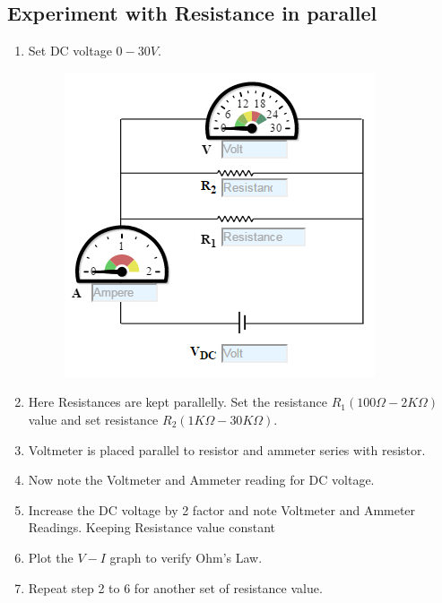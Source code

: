 		\subsection{Experiment with Resistance in parallel}
			\begin{enumerate}
				\tightlist
				\item
				Set DC voltage $0-30 V$.
				\begin{figure}[h]
					\centering
					\includegraphics[width=0.4\linewidth]{img/exp4/7}
					\caption{}
					\label{fig:exp4_3}
				\end{figure}
				\item
				Here Resistances are kept parallelly. Set the resistance $R_1 (100\Omega-
				2K\Omega)$ value and set resistance $R_2(1K\Omega -30K\Omega)$.
				\item
				Voltmeter is placed parallel to resistor and ammeter series with
				resistor.
				\item
				Now note the Voltmeter and Ammeter reading for DC voltage.				
				\item
				Increase the DC voltage by 2 factor and note Voltmeter and Ammeter
				Readings. Keeping Resistance value constant
				\item
				Plot the $V-I$ graph to verify Ohm's Law.
				\item
				Repeat step 2 to 6 for another set of resistance value.
			\end{enumerate}

